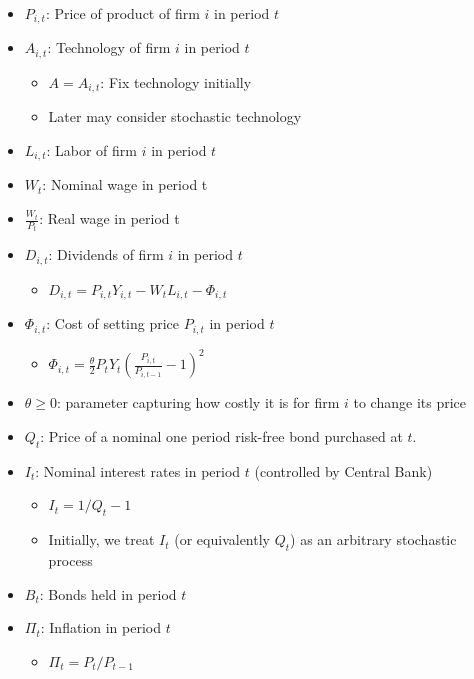 \documentclass[10pt]{article}
\begin{document}
\begin{itemize}
    \item $P_{i,t}$: Price of product of firm $i$ in period $t$
    \item $A_{i,t}$: Technology of firm $i$ in period $t$
        \begin{itemize}
            \item $A = A_{i,t}$: Fix technology initially
            \item Later may consider stochastic technology
        \end{itemize}
    \item $L_{i, t}$: Labor of firm $i$ in period $t$
    \item $W_t$: Nominal wage in period t
    \item $\frac{W_t}{P_t}$: Real wage in period t
    \item $D_{i, t}$: Dividends of firm $i$ in period $t$
        \begin{itemize}
            \item $D_{i, t}=P_{i, t} Y_{i, t}-W_t L_{i, t}-\Phi_{i, t}$
        \end{itemize}
    \item $\Phi_{i, t}$: Cost of setting price $P_{i,t}$ in period $t$
        \begin{itemize}
            \item $\Phi_{i, t}=\frac{\theta}{2} P_t Y_t\left(\frac{P_{i, t}}{P_{i, t-1}}-1\right)^2$
        \end{itemize}
    \item $\theta \geq 0$: parameter capturing how costly it is for firm $i$ to change its price
    \item $Q_t$: Price of a nominal one period risk-free bond purchased at $t$.
    \item $I_t$: Nominal interest rates in period $t$ (controlled by Central Bank)
        \begin{itemize}
            \item $I_t=1 / Q_t-1$
            \item Initially, we treat $I_t$ (or equivalently $Q_t$) as 
            an arbitrary stochastic process
        \end{itemize}
    \item $B_t$: Bonds held in period $t$
    \item $\Pi_t$: Inflation in period $t$
        \begin{itemize}
            \item $\Pi_t=P_t / P_{t-1}$
        \end{itemize}
\end{itemize}
\end{document}
